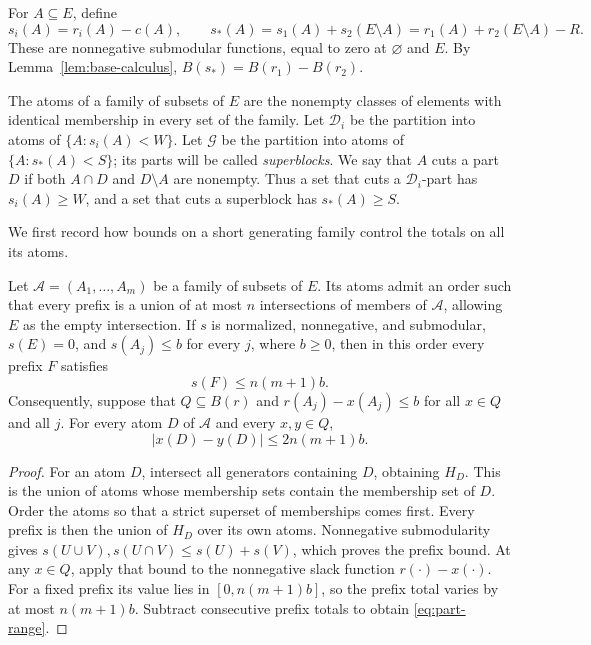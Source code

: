 For \(A\subseteq E\), define
\begin{equation}\label{eq:slack-functions}
 s_i(A)=r_i(A)-c(A),\qquad
 s_*(A)=s_1(A)+s_2(E\setminus A)
       =r_1(A)+r_2(E\setminus A)-R.
\end{equation}
These are nonnegative submodular functions, equal to zero at
\(\varnothing\) and \(E\).  By Lemma~\ref{lem:base-calculus},
\(B(s_*)=B(r_1)-B(r_2)\).

The atoms of a family of subsets of \(E\) are the nonempty classes of
elements with identical membership in every set of the family.  Let
\(\mathcal D_i\) be the partition into atoms of
\(\{A:s_i(A)<W\}\).  Let \(\mathcal G\) be the partition into atoms of
\(\{A:s_*(A)<S\}\); its parts will be called \emph{superblocks}.
We say that \(A\) cuts a part \(D\) if both \(A\cap D\) and
\(D\setminus A\) are nonempty.  Thus a set that cuts a
\(\mathcal D_i\)-part has \(s_i(A)\ge W\), and a set that cuts a
superblock has \(s_*(A)\ge S\).

We first record how bounds on a short generating family control the
totals on all its atoms.

\begin{lemma}\label{lem:generator-prefixes}
Let \(\mathcal A=(A_1,\ldots,A_m)\) be a family of subsets of \(E\).
Its atoms admit an order such that every prefix is a union of at most
\(n\) intersections of members of \(\mathcal A\), allowing \(E\) as
the empty intersection.  If \(s\) is normalized, nonnegative, and submodular,
\(s(E)=0\), and \(s(A_j)\le b\) for every \(j\), where \(b\ge0\),
then in this order
every prefix \(F\) satisfies
\[
 s(F)\le n(m+1)b.
\]
Consequently, suppose that \(Q\subseteq B(r)\) and
\(r(A_j)-x(A_j)\le b\) for all \(x\in Q\) and all \(j\).
For every atom \(D\) of \(\mathcal A\) and every \(x,y\in Q\),
\begin{equation}\label{eq:part-range}
 |x(D)-y(D)|\le 2n(m+1)b.
\end{equation}
\end{lemma}

\begin{proof}
For an atom \(D\), intersect all generators containing \(D\), obtaining
\(H_D\).  This is the union of atoms whose membership sets contain
the membership set of \(D\).  Order the atoms so that a strict superset
of memberships comes first.  Every prefix is then the union of
\(H_D\) over its own atoms.  Nonnegative submodularity gives
\(s(U\cup V),s(U\cap V)\le s(U)+s(V)\), which proves the prefix
bound.  At any \(x\in Q\), apply that bound to the nonnegative slack
function \(r(\cdot)-x(\cdot)\).  For a fixed prefix its value lies
in \([0,n(m+1)b]\), so the prefix total varies by at most
\(n(m+1)b\).  Subtract consecutive prefix totals to obtain
\eqref{eq:part-range}.
\end{proof}

